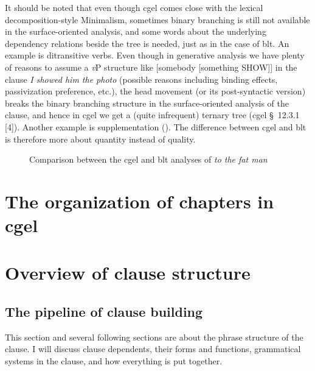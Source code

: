 \documentclass{article}
\newcommand*{\citesec}[1]{\S~{#1}}
\newcommand*{\corpus}[1]{\emph{#1}}
\newcommand*{\vP}{\textit{v}P}
\begin{document}
It should be noted that even though \ac{cgel} comes close with the lexical decomposition-style Minimalism,
sometimes binary branching is still not available in the surface-oriented analysis,
and some words about the underlying dependency relations beside the tree is needed,
just as in the case of \ac{blt}.
An example is ditransitive verbs. 
Even though in generative analysis we have plenty of reasons to assume a \vP{} structure like 
[somebody [something SHOW]] in the clause \corpus{I showed him the photo}
(possible reasons including binding effects, passivization preference, etc.),
the head movement (or its post-syntactic version) breaks the binary branching structure 
in the surface-oriented analysis of the clause,
and hence in \ac{cgel} we get a (quite infrequent) ternary tree (\ac{cgel} \citesec{12.3.1} [4]). 
Another example is supplementation ().
The difference between \ac{cgel} and \ac{blt} is therefore more about quantity instead of quality.

\begin{figure}
    \centering
    
    \caption{Comparison between the \ac{cgel} and \ac{blt} analyses of \corpus{to the fat man}}
    \label{fig:to-the-fat-man-blt}
\end{figure}

\section{The organization of chapters in \ac{cgel}}


\section{Overview of clause structure}

\subsection{The pipeline of clause building}\label{sec:pipeline}

This section and several following sections are about the phrase structure of the clause.
I will discuss clause dependents, 
their forms and functions,
grammatical systems in the clause,
and how everything is put together.
\end{document}
